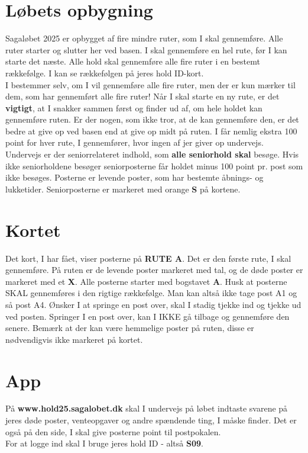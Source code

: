 \section{Løbets opbygning}
Sagaløbet 2025 er opbygget af fire mindre ruter, som I skal gennemføre. Alle ruter starter og slutter her ved basen. I skal gennemføre en hel rute, før I kan starte det næste. Alle hold skal gennemføre alle fire ruter i en bestemt rækkefølge. I kan se rækkefølgen på jeres hold ID-kort.\\\newline
I bestemmer selv, om I vil gennemføre alle fire ruter, men der er kun mærker til dem, som har gennemført alle fire ruter! Når I skal starte en ny rute, er det \textbf{vigtigt}, at I snakker sammen først og finder ud af, om hele holdet kan gennemføre ruten. Er der nogen, som ikke tror, at de kan gennemføre den, er det bedre at give op ved basen end at give op midt på ruten. I får nemlig ekstra 100 point for hver rute, I gennemfører, hvor ingen af jer giver op undervejs.\\
\newline
Undervejs er der seniorrelateret indhold, som \textbf{alle seniorhold skal} besøge. Hvis ikke seniorholdene besøger seniorposterne får holdet minus 100 point pr. post som ikke besøges. Posterne er levende poster, som har bestemte åbnings- og lukketider. Seniorposterne er markeret med orange \textbf{S} på kortene.\\
\newline
\section{Kortet}
Det kort, I har fået, viser posterne på \textbf{RUTE A}. Det er den første rute, I skal gennemføre. På ruten er de levende poster markeret med tal, og de døde poster er markeret med et \textbf{X}. Alle posterne starter med bogstavet \textbf{A}. Husk at posterne SKAL gennemføres i den rigtige rækkefølge. Man kan altså ikke tage post A1 og så post A4. Ønsker I at springe en post over, skal I stadig tjekke ind og tjekke ud ved posten. Springer I en post over, kan I IKKE gå tilbage og gennemføre den senere. Bemærk at der kan være hemmelige poster på ruten, disse er nødvendigvis ikke markeret på kortet.
\section{App}
På \textbf{www.hold25.sagalobet.dk} skal I undervejs på løbet indtaste svarene på jeres døde poster, venteopgaver og andre spændende ting, I måske finder. Det er også på den side, I skal give posterne point til postpokalen.\\
For at logge ind skal I bruge jeres hold ID - altså \textbf{S09}.
\newpage

